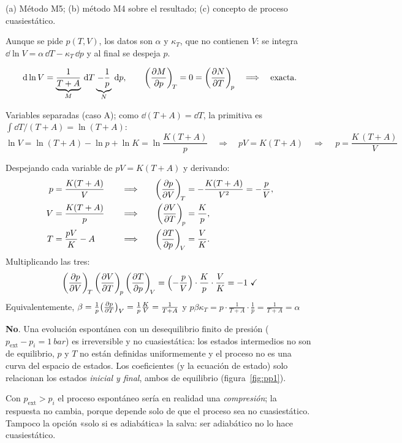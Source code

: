 \begin{resolucion}
\idea (a) Método M5; (b) método M4 sobre el resultado; (c) concepto de proceso cuasiestático.

 Aunque se pide $p(T,V)$, los datos son $\alpha$ y $\kappa_T$,
que no contienen $V$: se integra $\dd\ln V=\alpha\,\dd T-\kappa_T\,\dd p$ y al final se despeja $p$.

\[
  \mathrm{d}\ln V=\underbrace{\frac{1}{T+A}}_{M}\,\mathrm{d} T\underbrace{-\frac{1}{p}}_{N}\,\mathrm{d} p,\qquad
  \left(\frac{\partial M}{\partial p}\right)_{\!T}=0=\left(\frac{\partial N}{\partial T}\right)_{\!p}\quad\Longrightarrow\quad\text{exacta.}
\]

 Variables separadas (caso A); como $\dd(T+A)=\dd T$, la
primitiva es $\int\dd T/(T+A)=\ln(T+A)$:
\[
  \ln V=\ln(T+A)-\ln p+\ln K=\ln\frac{K(T+A)}{p}
  \quad\Longrightarrow\quad pV=K(T+A)\quad\Longrightarrow\quad\boxed{\,p=\frac{K\,(T+A)}{V}\,}
\]

 Despejando cada variable de $pV=K(T+A)$ y derivando:
\begin{alignat*}{3}
  p&=\frac{K(T+A)}{V} &\quad&\Longrightarrow\quad& \left(\frac{\partial p}{\partial V}\right)_{\!T}&=-\frac{K(T+A)}{V^2}=-\frac pV,\\
  V&=\frac{K(T+A)}{p} &&\Longrightarrow& \left(\frac{\partial V}{\partial T}\right)_{\!p}&=\frac Kp,\\
  T&=\frac{pV}{K}-A &&\Longrightarrow& \left(\frac{\partial T}{\partial p}\right)_{\!V}&=\frac VK.
\end{alignat*}
Multiplicando las tres:
\[
  \left(\frac{\partial p}{\partial V}\right)_{\!T}\left(\frac{\partial V}{\partial T}\right)_{\!p}\left(\frac{\partial T}{\partial p}\right)_{\!V}=\Bigl(-\frac pV\Bigr)\cdot\frac Kp\cdot\frac VK=-1\ \checkmark
\]
Equivalentemente, $\beta=\frac1p\bigl(\tfrac{\partial p}{\partial T}\bigr)_{V}=\frac1p\frac KV=\frac{1}{T+A}$ y
$p\beta\kappa_T=p\cdot\frac{1}{T+A}\cdot\frac1p=\frac{1}{T+A}=\alpha$\chk

 \textbf{No}. Una evolución espontánea con un desequilibrio finito de presión
($p_{\mathrm{ext}}-p_i=\SI{1}{bar}$) es irreversible y no cuasiestática: los estados intermedios no son de
equilibrio, $p$ y $T$ no están definidas uniformemente y el proceso no es una curva del espacio de
estados. Los coeficientes (y la ecuación de estado) solo relacionan los estados \emph{inicial y final},
ambos de equilibrio (figura~\ref{fig:pp1}).
\end{resolucion}

\begin{observacion}
Con $p_{\mathrm{ext}}>p_i$ el proceso espontáneo sería en realidad una \emph{compresión}; la respuesta no
cambia, porque depende solo de que el proceso sea no cuasiestático. Tampoco la opción «solo si es
adiabática» la salva: ser adiabático no lo hace cuasiestático.
\end{observacion}

